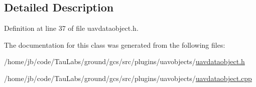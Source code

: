 \subsection{\-Detailed \-Description}


\-Definition at line 37 of file uavdataobject.\-h.



\-The documentation for this class was generated from the following files\-:\begin{DoxyCompactItemize}
\item 
/home/jb/code/\-Tau\-Labs/ground/gcs/src/plugins/uavobjects/\hyperlink{uavdataobject_8h}{uavdataobject.\-h}\item 
/home/jb/code/\-Tau\-Labs/ground/gcs/src/plugins/uavobjects/\hyperlink{uavdataobject_8cpp}{uavdataobject.\-cpp}\end{DoxyCompactItemize}
